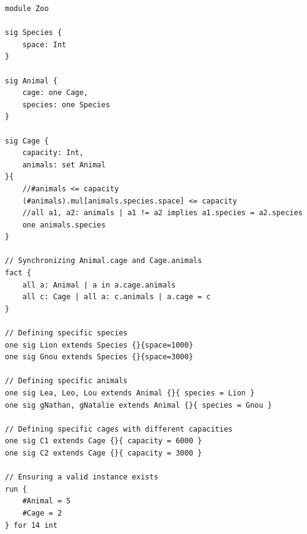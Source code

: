 \begin{lstlisting}
module Zoo

sig Species {
	space: Int
}

sig Animal {
    cage: one Cage,
    species: one Species
}

sig Cage {
    capacity: Int,
    animals: set Animal
}{
    //#animals <= capacity
	(#animals).mul[animals.species.space] <= capacity
    //all a1, a2: animals | a1 != a2 implies a1.species = a2.species
	one animals.species
}

// Synchronizing Animal.cage and Cage.animals
fact {
    all a: Animal | a in a.cage.animals
    all c: Cage | all a: c.animals | a.cage = c
}

// Defining specific species
one sig Lion extends Species {}{space=1000}
one sig Gnou extends Species {}{space=3000}

// Defining specific animals
one sig Lea, Leo, Lou extends Animal {}{ species = Lion }
one sig gNathan, gNatalie extends Animal {}{ species = Gnou }

// Defining specific cages with different capacities
one sig C1 extends Cage {}{ capacity = 6000 }
one sig C2 extends Cage {}{ capacity = 3000 }

// Ensuring a valid instance exists
run {
    #Animal = 5
    #Cage = 2
} for 14 int
\end{lstlisting}